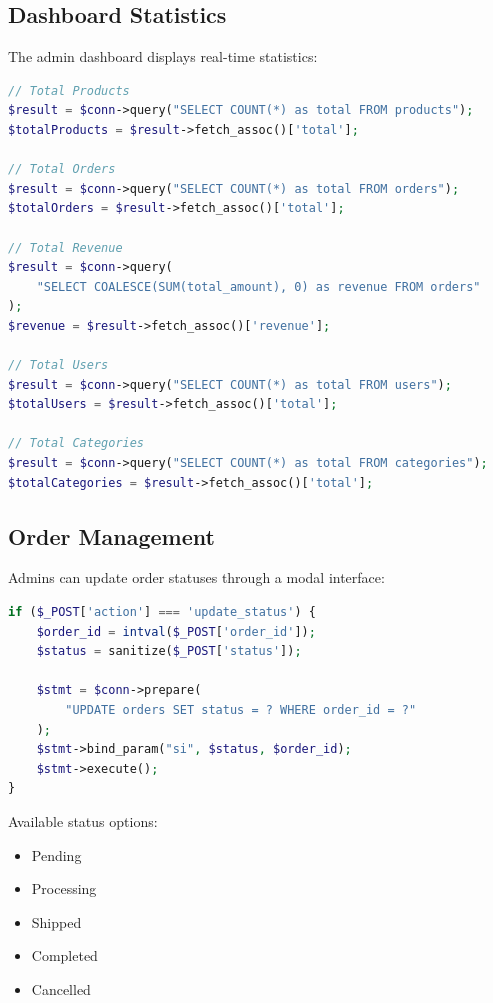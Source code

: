 \documentclass[12pt,a4paper]{article}
\begin{document}
\subsection{Dashboard Statistics}

The admin dashboard displays real-time statistics:

\begin{lstlisting}[language=PHP, caption=Dashboard Statistics Queries]
// Total Products
$result = $conn->query("SELECT COUNT(*) as total FROM products");
$totalProducts = $result->fetch_assoc()['total'];

// Total Orders
$result = $conn->query("SELECT COUNT(*) as total FROM orders");
$totalOrders = $result->fetch_assoc()['total'];

// Total Revenue
$result = $conn->query(
    "SELECT COALESCE(SUM(total_amount), 0) as revenue FROM orders"
);
$revenue = $result->fetch_assoc()['revenue'];

// Total Users
$result = $conn->query("SELECT COUNT(*) as total FROM users");
$totalUsers = $result->fetch_assoc()['total'];

// Total Categories
$result = $conn->query("SELECT COUNT(*) as total FROM categories");
$totalCategories = $result->fetch_assoc()['total'];
\end{lstlisting}

\subsection{Order Management}

Admins can update order statuses through a modal interface:

\begin{lstlisting}[language=PHP, caption=Order Status Update]
if ($_POST['action'] === 'update_status') {
    $order_id = intval($_POST['order_id']);
    $status = sanitize($_POST['status']);
    
    $stmt = $conn->prepare(
        "UPDATE orders SET status = ? WHERE order_id = ?"
    );
    $stmt->bind_param("si", $status, $order_id);
    $stmt->execute();
}
\end{lstlisting}

Available status options:
\begin{itemize}
    \item Pending
    \item Processing
    \item Shipped
    \item Completed
    \item Cancelled
\end{itemize}
\end{document}
